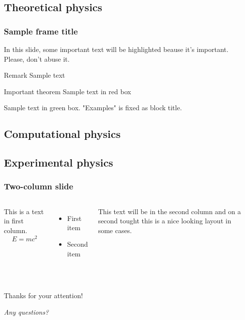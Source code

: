 \documentclass{beamer}
\begin{document}
\subsection{Theoretical physics}
\begin{frame}
\frametitle{Sample frame title}

In this slide, some important text will be
\alert{highlighted} beause it's important.
Please, don't abuse it.

\begin{block}{Remark}
Sample text
\end{block}

\begin{alertblock}{Important theorem}
Sample text in red box
\end{alertblock}

\begin{examples}
Sample text in green box. "Examples" is fixed as block title.
\end{examples}
\end{frame}
\subsection{Computational physics}

\subsection{Experimental physics}
\begin{frame}
\frametitle{Two-column slide}

\begin{columns}

This is a text in first column.
$$E=mc^2$$
\begin{itemize}
\item First item
\item Second item
\end{itemize}

This text will be in the second column
and on a second tought this is a nice looking
layout in some cases.
\end{columns}
\end{frame}

\section{}
\begin{frame}%
	\begin{center}
	\Huge{\alert{Thanks for your attention!}}\par
	\Huge{\textit{Any questions?}}
    \end{center}
\end{frame}
\end{document}
